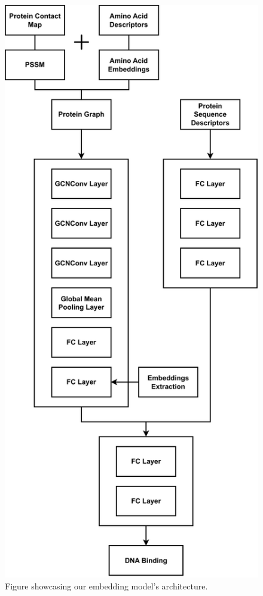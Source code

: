 \begin{figure}[!h]
    \centering
    \includegraphics[width=1.0\linewidth]{images/Embeddings_NN_Architecture.pdf}    
    \caption{Figure showcasing our embedding model's architecture.}
    \label{fig:Embeddings_NN_Architecture} 
\end{figure}


